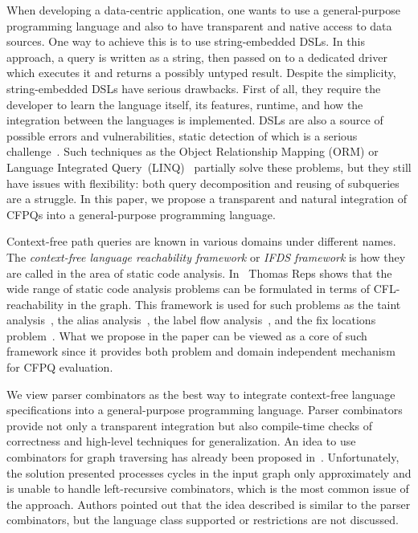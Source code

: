 When developing a data-centric application, one wants to use a general-purpose programming language and also to have transparent and native access to data sources.
One way to achieve this is to use string-embedded DSLs.
In this approach, a query is written as a string, then passed on to a dedicated driver which executes it and returns a possibly untyped result.
Despite the simplicity, string-embedded DSLs have serious drawbacks.
First of all, they require the developer to learn the language itself, its features, runtime, and how the integration between the languages is implemented.
DSLs are also a source of possible errors and vulnerabilities, static detection of which is a serious challenge~\cite{stringEmbeddedLanguagesProblem}.
Such techniques as the Object Relationship Mapping (ORM) or Language Integrated Query~(LINQ)~\cite{LINQ1, LINQ2, LinqRDF} partially solve these problems, but they still have issues with flexibility: both query decomposition and  reusing of subqueries are a struggle.
In this paper, we propose a transparent and natural integration of CFPQs into a general-purpose programming language.

Context-free path queries are known in various domains under different names. The \emph{context-free language reachability framework} or  \emph{IFDS framework} is how they are called in the area of static code analysis.
In~\cite{Reps:1995, Reps} Thomas Reps shows that the wide range of static code analysis problems can be formulated in terms of CFL-reachability in the graph.
This framework is used for such problems as the taint analysis~\cite{CFLTaint}, the alias analysis~\cite{JavaCFL, Zheng, CFLGraspan}, the label flow analysis~\cite{LabelFlowCFLReachability}, and the fix locations problem~\cite{CFLfinding}.
What we propose in the paper can be viewed as a core of such framework since it provides both problem and domain independent mechanism for CFPQ evaluation.

We view parser combinators as the best way to integrate context-free language specifications into a general-purpose programming language. Parser combinators provide not only a transparent integration but also compile-time checks of correctness and high-level techniques for generalization. An idea to use combinators for graph traversing has already been proposed in~\cite{ScalaGraphParsing}. Unfortunately, the solution presented processes cycles in the input graph only approximately and is unable to handle left-recursive combinators, which is the most common issue of the approach. Authors pointed out that the idea described is similar to the parser combinators, but the language class supported or restrictions are not discussed.


